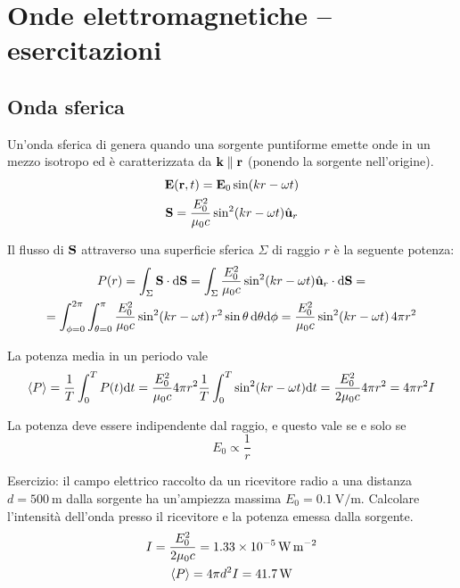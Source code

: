 \chapter{Onde elettromagnetiche -- esercitazioni}

\section{Onda sferica}

Un'onda sferica di genera quando una sorgente puntiforme emette onde in un mezzo isotropo ed è caratterizzata da $\mathbf{k} \parallel \mathbf{r}$ (ponendo la sorgente nell'origine).
\begin{gather}
    \mathbf{E}(\mathbf{r}, t) = \mathbf{E}_0 \sin(k r - \omega t) \\
    \mathbf{S} = \frac{E_0^2}{\mu_0 c} \sin^2(kr - \omega t) \hat{\mathbf{u}}_{r}
\end{gather}

Il flusso di $\mathbf{S}$ attraverso una superficie sferica $\Sigma$ di raggio $r$ è la seguente potenza:
\begin{equation}
\begin{gathered}
    P(r) = \int_\Sigma \mathbf{S} \cdot \mathrm{d} \mathbf{S} = \int_{\Sigma} \frac{E_0^2}{\mu_0 c} \sin^2(kr - \omega t) \hat{\mathbf{u}}_{r} \cdot \mathrm{d} \mathbf{S} = \\
    = \int_{\phi = 0}^{2\pi} \int_{\theta = 0}^{\pi} \frac{E_0^2}{\mu_0 c} \sin^2(kr - \omega t) \, r^2 \sin\theta \, \mathrm{d}\theta \mathrm{d}\phi
    = \frac{E_0^2}{\mu_0 c} \sin^2(kr - \omega t) \, 4 \pi r^2
\end{gathered}
\end{equation}

La potenza media in un periodo vale
\begin{equation}
    \left\langle P \right\rangle = \frac{1}{T} \int_0^T P(t) \mathrm{d} t
    = \frac{E_0^2}{\mu_0 c} 4 \pi r^2 \frac{1}{T} \int_0^T \sin^2(kr - \omega t) \mathrm{d} t
    = \frac{E_0^2}{2\mu_0 c} 4 \pi r^2
    = 4 \pi r^2 I
\end{equation}

La potenza deve essere indipendente dal raggio, e questo vale se e solo se
\begin{equation}
    E_0 \propto \frac{1}{r}
\end{equation}

Esercizio: il campo elettrico raccolto da un ricevitore radio a una distanza $d = \qty{500}{\metre}$ dalla sorgente ha un'ampiezza massima $E_0 = \qty{0.1}{\volt\per\metre}$. Calcolare l'intensità dell'onda presso il ricevitore e la potenza emessa dalla sorgente.
\begin{gather}
    I = \frac{E_0^2}{2 \mu_0 c} = \qty{1.33e-5}{\watt\per\metre\squared} \\
    \left\langle P \right\rangle = 4 \pi d^2 I = \qty{41.7}{\watt}
\end{gather}
